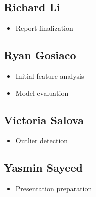 \documentclass[letterpaper, 12 pt, conference]{ieeeconf}  %
\begin{document}
\subsection*{Richard Li}
        \begin{itemize}
                \item Report finalization
        \end{itemize}

\subsection*{Ryan Gosiaco}
        \begin{itemize}
                \item Initial feature analysis
                \item Model evaluation
        \end{itemize}

\subsection*{Victoria Salova}
        \begin{itemize}
                \item Outlier detection
        \end{itemize}

\subsection*{Yasmin Sayeed}
        \begin{itemize}
                \item Presentation preparation
        \end{itemize}
\end{document}
